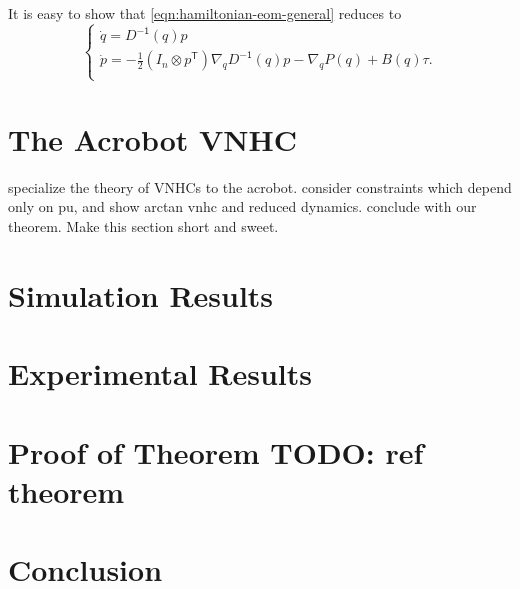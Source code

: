 \documentclass[journal,twoside,web]{ieeecolor}
\newcommand*{\tpose}{^\mathsf{T}}
\newcommand*{\inv}{^\mathsf{-1}}
\newcommand*{\Id}[1]{I_{#1}}
\begin{document}
It is easy to show that \eqref{eqn:hamiltonian-eom-general} reduces to
\begin{equation}\label{eqn:hamiltonian-full-dynamics}
     \begin{cases}
        \dot{q} = D\inv(q)p \\
        \dot{p} = -\frac{1}{2} (\Id{n} \otimes p\tpose) \nabla_q D\inv(q) p
        - \nabla_q P(q) + B(q) \tau
        . \\
    \end{cases}
\end{equation}

\section{The Acrobot VNHC}\label{sec:acrobot}
specialize the theory of VNHCs to the acrobot. consider constraints which depend
only on pu, and show arctan vnhc and reduced dynamics. conclude with our
theorem. Make this section short and sweet.

\section{Simulation Results}\label{sec:simulations}

\section{Experimental Results}\label{sec:experiments}

\section{Proof of Theorem \textbf{TODO: ref theorem}}\label{sec:proof}

\section{Conclusion}\label{sec:conclusion}



\end{document}
